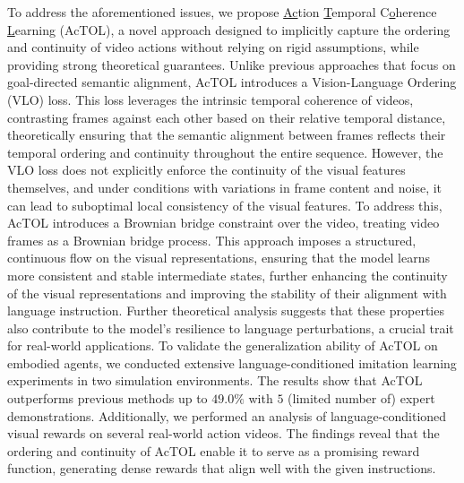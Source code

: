 To address the aforementioned issues, we propose \underline{Ac}tion \underline{T}emporal C\underline{o}herence \underline{L}earning (AcTOL), a novel approach designed to implicitly capture the ordering and continuity of video actions without relying on rigid assumptions, while providing strong theoretical guarantees. Unlike previous approaches that focus on goal-directed semantic alignment, AcTOL introduces a Vision-Language Ordering (VLO) loss. This loss leverages the intrinsic temporal coherence of videos, contrasting frames against each other based on their relative temporal distance, theoretically ensuring that the semantic alignment between frames reflects their temporal ordering and continuity throughout the entire sequence. However, the VLO loss does not explicitly enforce the continuity of the visual features themselves, and under conditions with variations in frame content and noise, it can lead to suboptimal local consistency of the visual features. To address this, AcTOL introduces a Brownian bridge constraint over the video, treating video frames as a Brownian bridge process. This approach imposes a structured, continuous flow on the visual representations, ensuring that the model learns more consistent and stable intermediate states, further enhancing the continuity of the visual representations and improving the stability of their alignment with language instruction. 
Further theoretical analysis suggests that these properties also contribute to the model's resilience to language perturbations, a crucial trait for real-world applications. 
To validate the generalization ability of AcTOL on embodied agents, we conducted extensive language-conditioned imitation learning experiments in two simulation environments. The results show that AcTOL outperforms previous methods up to $49.0\%$ with $5$ (limited number of) expert demonstrations. Additionally, we performed an analysis of language-conditioned visual rewards on several real-world action videos. The findings reveal that the ordering and continuity of AcTOL enable it to serve as a promising reward function, generating dense rewards that align well with the given instructions.

\vspace{-1ex}

